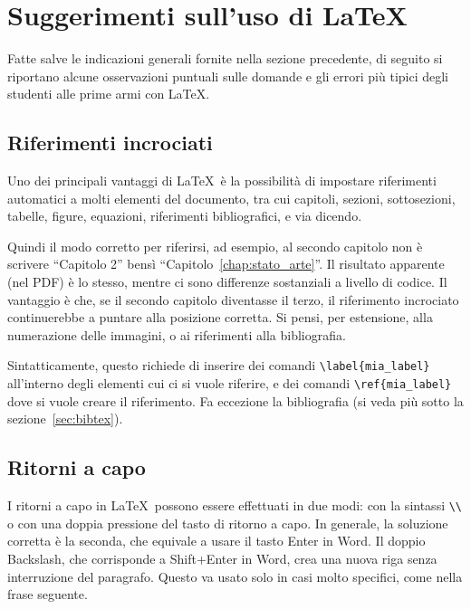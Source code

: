 \documentclass[12pt]{report}
\begin{document}
\section{Suggerimenti sull'uso di \LaTeX}
\label{sec:consigli_latex}

Fatte salve le indicazioni generali fornite nella sezione precedente, di seguito si riportano alcune osservazioni puntuali sulle domande e gli errori pi\`u tipici degli studenti alle prime armi con \LaTeX.

\subsection{Riferimenti incrociati}

Uno dei principali vantaggi di \LaTeX\ è la possibilità di impostare riferimenti automatici a molti elementi del documento, tra cui capitoli, sezioni, sottosezioni, tabelle, figure, equazioni, riferimenti bibliografici, e via dicendo.

Quindi il modo corretto per riferirsi, ad esempio, al secondo capitolo non è scrivere ``Capitolo 2'' bensì ``Capitolo~\ref{chap:stato_arte}''. Il risultato apparente (nel PDF) è lo stesso, mentre ci sono differenze sostanziali a livello di codice. Il vantaggio è che, se il secondo capitolo diventasse il terzo, il riferimento incrociato continuerebbe a puntare alla posizione corretta. Si pensi, per estensione, alla numerazione delle immagini, o ai riferimenti alla bibliografia.

Sintatticamente, questo richiede di inserire dei comandi \verb|\label{mia_label}| all'interno degli elementi cui ci si vuole riferire, e dei comandi \verb|\ref{mia_label}| dove si vuole creare il riferimento. Fa eccezione la bibliografia (si veda pi\`u sotto la sezione~\ref{sec:bibtex}).


\subsection{Ritorni a capo}

I ritorni a capo in \LaTeX\ possono essere effettuati in due modi: con la sintassi \verb|\\| o con una doppia pressione del tasto di ritorno a capo. In generale, la soluzione corretta è la seconda, che equivale a usare il tasto Enter in Word. Il doppio Backslash, che corrisponde a Shift+Enter in Word, crea una nuova riga senza interruzione del paragrafo. Questo va usato solo in casi molto specifici, come nella frase seguente.
\end{document}
